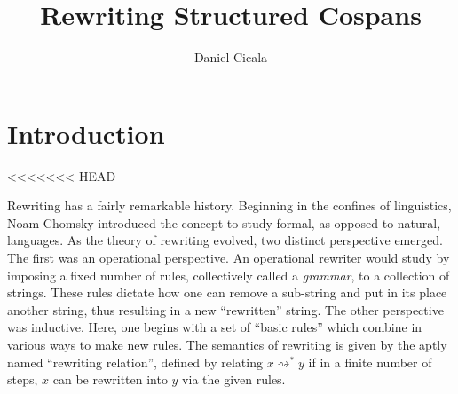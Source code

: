 \documentclass{amsart}
\author{Daniel Cicala}
\title{Rewriting Structured Cospans}
\newcommand{\deriv}[2]{#1 \rightsquigarrow^\ast #2}
\theoremstyle{remark}
\theoremstyle{definition}
\begin{document}
\maketitle{}


\section{Introduction}
<<<<<<< HEAD
\label{sec:Introduction}

Rewriting has a fairly remarkable history. Beginning in the confines
of linguistics, Noam Chomsky \cite{Chomsky} introduced the concept to
study formal, as opposed to natural, languages. As the theory of
rewriting evolved, two distinct perspective emerged. The first was an
operational perspective. An operational rewriter would study by
imposing a fixed number of rules, collectively called a
\emph{grammar}, to a collection of strings. These rules dictate how
one can remove a sub-string and put in its place another string, thus
resulting in a new ``rewritten'' string.  The other perspective was
inductive.  Here, one begins with a set of ``basic rules'' which
combine in various ways to make new rules. The semantics of rewriting
is given by the aptly named ``rewriting relation'', defined by
relating $ \deriv{x}{y} $ if in a finite number of steps, $ x $ can be
rewritten into $ y $ via the given rules.
\end{document}
